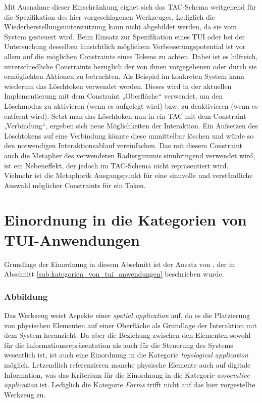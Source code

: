 Mit Ausnahme dieser Einschränkung eignet sich das \gls{TAC}-Schema weitgehend für die Spezifikation des hier vorgeschlagenen Werkzeuges. Lediglich die Wiederherstellungsunterstützung kann nicht abgebildet werden, da sie vom System gesteuert wird. Beim Einsatz zur Spezifikation eines \gls{TUI} oder bei der Untersuchung desselben hinsichtlich möglichem Verbesserungspotential ist vor allem auf die möglichen Constraints eines Tokens zu achten. Dabei ist es hilfreich, unterschiedliche Constraints bezüglich der von ihnen vorgegebenen oder durch sie ermöglichten Aktionen zu betrachten. Als Beispiel im konkreten System kann wiederum das Löschtoken verwendet werden. Dieses wird in der aktuellen Implementierung mit dem Constraint „Oberfläche“ verwendet, um den Löschmodus zu aktivieren (wenn es aufgelegt wird) bzw. zu deaktivieren (wenn es entfernt wird). Setzt man das Löschtoken nun in ein \gls{TAC} mit dem Constraint „Verbindung“, ergeben sich neue Möglichkeiten der Interaktion. Ein Aufsetzen des Löschtokens auf eine Verbindung könnte diese unmittelbar löschen und würde so den notwendigen Interaktionsablauf vereinfachen. Das mit diesem Constraint auch die Metapher des verwendeten Radiergummis sinnbringend verwendet wird, ist ein Nebeneffekt, der jedoch im \gls{TAC}-Schema nicht repräsentiert wird. Vielmehr ist die Metaphorik Ausgangspunkt für eine sinnvolle und verständliche Auswahl möglicher Constraints für ein Token.


\section{Einordnung in die Kategorien von TUI-Anwendungen} %
\label{sec:einordnung_in_die_kategorien_von_tui_anwendungen}

Grundlage der Einordnung in diesem Abschnitt ist der Ansatz von \citet{Klemmer04}, der in Abschnitt \ref{sub:kategorien_von_tui_anwendungen} beschrieben wurde.

\subsubsection{Abbildung}

Das Werkzeug weist Aspekte einer \emph{spatial application} auf, da es die Platzierung von physischen Elementen auf einer Oberfläche als Grundlage der Interaktion mit dem System heranzieht. Da aber die Beziehung zwischen den Elementen sowohl für die Informationsrepräsentation als auch für die Steuerung des Systems wesentlich ist, ist auch eine Einordnung in die Kategorie \emph{topological application} möglich. Letzendlich referenzieren manche physische Elemente auch auf digitale Information, was das Kriterium für die Einordnung in die Kategorie \emph{associative application} ist. Lediglich die Kategorie \emph{Forms} trifft nicht auf das hier vorgestellte Werkzeug zu. 

